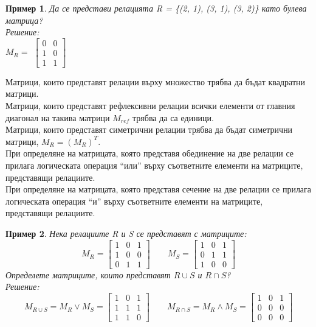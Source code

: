 \documentclass[fleqn, 12pt]{article}
\newtheorem{example}{Пример}[subsection]
\begin{document}
\begin{example}
Да се представи релацията R = \{(2, 1), (3, 1), (3, 2)\} като булева матрица? \\
Решение: \\
$M_R = $
$\left[
\begin{matrix}
0 & 0\\
1 & 0\\
1 & 1
\end{matrix}
\right]$
\end{example}
Матрици, които представят релации върху множество трябва да бъдат квадратни матрици.\\
Матрици, които представят рефлексивни релации всички елементи от главния диагонал на такива матрици $M_{ref}$ трябва да са единици.\\
Матрици, които представят симетрични релации трябва да бъдат симетрични матрици, $M_R= (M_R)^T$.\\
При определяне на матрицата, която представя обединение на две релации се прилага логическата операция “или” върху съответните елементи на матриците, представящи релациите.\\
При определяне на матрицата, която представя сечение на две релации се прилага логическата операция “и” върху съответните елементи на матриците, представящи релациите. \\
\begin{example}
Нека релациите R и S се представят с матриците:
$$
M_R = 
\left[
\begin{matrix}
1 & 0 & 1\\
1 & 0 & 0\\
0 & 1 & 1
\end{matrix}
\right]
\qquad 
M_S = 
\left[
\begin{matrix}
1 & 0 & 1\\
0 & 1 & 1\\
1 & 0 & 0
\end{matrix}
\right]
$$
Определете матриците, които представят $R \cup S$ и $R \cap S$? \\
Решение: \\
$$
M_{R \cup S} = M_R \lor M_S = 
\left[
\begin{matrix}
1 & 0 & 1\\
1 & 1 & 1\\
1 & 1 & 0
\end{matrix}
\right]
\qquad
M_{R \cap S} = M_R \land M_S =
\left[
\begin{matrix}
1 & 0 & 1\\
0 & 0 & 0\\
0 & 0 & 0
\end{matrix}
\right]
$$
\end{example}
\end{document}
